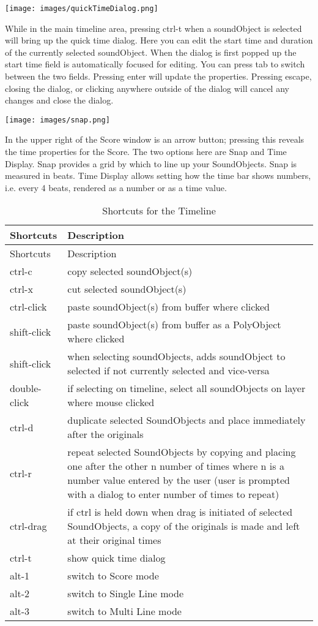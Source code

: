 \texttt{[image: images/quickTimeDialog.png]}

While in the main timeline area, pressing ctrl-t when a soundObject is
selected will bring up the quick time dialog. Here you can edit the
start time and duration of the currently selected soundObject. When the
dialog is first popped up the start time field is automatically focused
for editing. You can press tab to switch between the two fields.
Pressing enter will update the properties. Pressing escape, closing the
dialog, or clicking anywhere outside of the dialog will cancel any
changes and close the dialog.

\texttt{[image: images/snap.png]}

In the upper right of the Score window is an arrow button; pressing this
reveals the time properties for the Score. The two options here are Snap
and Time Display. Snap provides a grid by which to line up your
SoundObjects. Snap is measured in beats. Time Display allows setting how
the time bar shows numbers, i.e. every 4 beats, rendered as a number or
as a time value.

\begin{longtable}[]{@{}ll@{}}
\caption{Shortcuts for the Timeline}\tabularnewline
\toprule
Shortcuts & Description\tabularnewline
\midrule
\endfirsthead
\toprule
Shortcuts & Description\tabularnewline
\midrule
\endhead
ctrl-c & copy selected soundObject(s)\tabularnewline
ctrl-x & cut selected soundObject(s)\tabularnewline
ctrl-click & paste soundObject(s) from buffer where
clicked\tabularnewline
shift-click & paste soundObject(s) from buffer as a PolyObject where
clicked\tabularnewline
shift-click & when selecting soundObjects, adds soundObject to selected
if not currently selected and vice-versa\tabularnewline
double-click & if selecting on timeline, select all soundObjects on
layer where mouse clicked\tabularnewline
ctrl-d & duplicate selected SoundObjects and place immediately after the
originals\tabularnewline
ctrl-r & repeat selected SoundObjects by copying and placing one after
the other n number of times where n is a number value entered by the
user (user is prompted with a dialog to enter number of times to
repeat)\tabularnewline
ctrl-drag & if ctrl is held down when drag is initiated of selected
SoundObjects, a copy of the originals is made and left at their original
times\tabularnewline
ctrl-t & show quick time dialog\tabularnewline
alt-1 & switch to Score mode\tabularnewline
alt-2 & switch to Single Line mode\tabularnewline
alt-3 & switch to Multi Line mode\tabularnewline
\bottomrule
\end{longtable}

